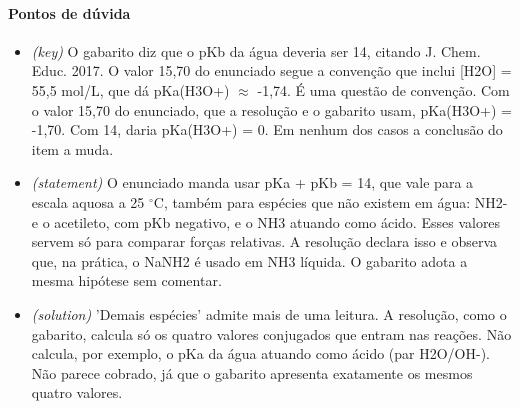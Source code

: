 \documentclass{article}%
\begin{document}
\paragraph{Pontos de dúvida}%
\begin{itemize}%
\item%
\textit{(key)} O gabarito diz que o pKb da água deveria ser 14, citando J. Chem. Educ. 2017. O valor 15,70 do enunciado segue a convenção que inclui {[}H2O{]} = 55,5 mol/L, que dá pKa(H3O+) $\approx$ -1,74. É uma questão de convenção. Com o valor 15,70 do enunciado, que a resolução e o gabarito usam, pKa(H3O+) = -1,70. Com 14, daria pKa(H3O+) = 0. Em nenhum dos casos a conclusão do item a muda.%
\item%
\textit{(statement)} O enunciado manda usar pKa + pKb = 14, que vale para a escala aquosa a 25 $^\circ$C, também para espécies que não existem em água: NH2- e o acetileto, com pKb negativo, e o NH3 atuando como ácido. Esses valores servem só para comparar forças relativas. A resolução declara isso e observa que, na prática, o NaNH2 é usado em NH3 líquida. O gabarito adota a mesma hipótese sem comentar.%
\item%
\textit{(solution)} 'Demais espécies' admite mais de uma leitura. A resolução, como o gabarito, calcula só os quatro valores conjugados que entram nas reações. Não calcula, por exemplo, o pKa da água atuando como ácido (par H2O/OH-). Não parece cobrado, já que o gabarito apresenta exatamente os mesmos quatro valores.%
\end{itemize}%
\end{document}

